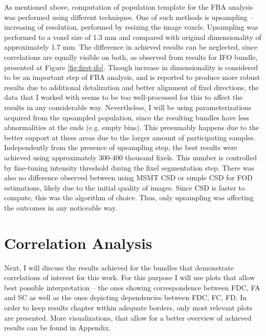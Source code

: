 \documentclass[thesis.tex]{subfiles}
\begin{document}
As mentioned above, computation of population template for the FBA analysis was performed using different techniques. One of such methods is upsampling -- increasing of resolution, performed by resizing the image voxels. Upsampling was performed to a voxel size of 1.3 mm and compared with original dimensionality of approximately 1.7 mm. The difference in achieved results can be neglected, since correlations are equally visible on both, as observed from results for IFO bundle, presented at Figure \ref{fig:first-ifo}. Though increase in dimensionality is considered to be an important step of FBA analysis, and is reported to produce more robust results due to additional detalization and better alignment of fixel directions, the data that I worked with seems to be too well-processed for this to affect the results in any considerable way. Nevertheless, I will be using parameterizations acquired from the upsampled population, since the resulting bundles have less abnormalities at the ends (e.g. empty bins). This presumably happens due to the better support at these areas due to the larger amount of participating samples. Independently from the presence of upsampling step, the best results were achieved using approximately 300-400 thousand fixels. This number is controlled by fine-tuning intensity threshold during the fixel segmentation step. There was also no difference observed between using MSMT CSD or simple CSD for FOD estimations, likely due to the initial quality of images. Since CSD is faster to compute, this was the algorithm of choice. Thus, only upsampling was affecting the outcomes in any noticeable way.
\section{Correlation Analysis}
Next, I will discuss the results achieved for the bundles that demonstrate correlations of interest for this work. For this purpose I will use plots that allow best possible interpretation -- the ones showing correspondence between FDC, FA and SC as well as the ones depicting dependencies between FDC, FC, FD. In order to keep results chapter within adequate borders, only most relevant plots are presented. More visualizations, that allow for a better overview of achieved results can be found in Appendix.
\end{document}
